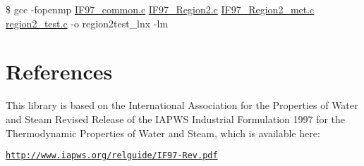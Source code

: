 \$ gcc -\/fopenmp \hyperlink{IF97__common_8c_source}{I\-F97\-\_\-common.\-c} \hyperlink{IF97__Region2_8c_source}{I\-F97\-\_\-\-Region2.\-c} \hyperlink{IF97__Region2__met_8c_source}{I\-F97\-\_\-\-Region2\-\_\-met.\-c} \hyperlink{region2__test_8c_source}{region2\-\_\-test.\-c} -\/o region2test\-\_\-lnx -\/lm


\begin{DoxyItemize}
\item 
\end{DoxyItemize}\hypertarget{index_refs}{}\section{References}\label{index_refs}
This library is based on the International Association for the Properties of Water and Steam Revised Release of the I\-A\-P\-W\-S Industrial Formulation 1997 for the Thermodynamic Properties of Water and Steam, which is available here\-:

\href{http://www.iapws.org/relguide/IF97-Rev.pdf}{\tt http\-://www.\-iapws.\-org/relguide/\-I\-F97-\/\-Rev.\-pdf} 